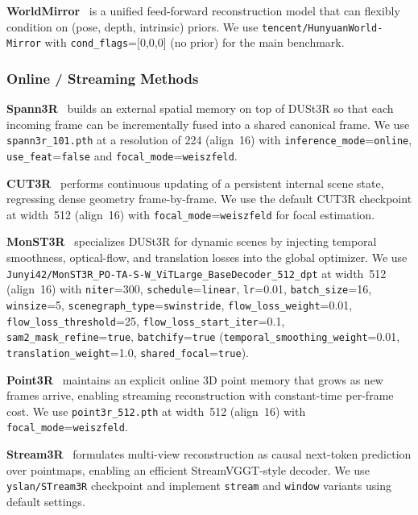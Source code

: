 \documentclass{llmxive}
\begin{document}
\textbf{WorldMirror}~\citep{liu2025worldmirror} is a unified feed-forward reconstruction model that can flexibly condition on (pose, depth, intrinsic) priors.
%
We use \texttt{tencent/HunyuanWorld-Mirror} with \texttt{cond\_flags}=[0,0,0] (no prior) for the main benchmark.

\subsubsection{Online / Streaming Methods}

\textbf{Spann3R}~\citep{wang2024spann3r} builds an external spatial memory on top of DUSt3R so that each incoming frame can be incrementally fused into a shared canonical frame.
%
We use \texttt{spann3r\_101.pth} at a resolution of 224 (align~16) with \texttt{inference\_mode}=\texttt{online}, \texttt{use\_feat}=\texttt{false} and
\texttt{focal\_mode}=\texttt{weiszfeld}.

\textbf{CUT3R}~\citep{wang2025cut3r} performs continuous updating of a persistent internal scene state, regressing dense geometry frame-by-frame. We use the default CUT3R checkpoint at width~512 (align~16) with \texttt{focal\_mode}=\texttt{weiszfeld} for focal estimation.

\textbf{MonST3R}~\citep{zhang2024monst3r} specializes DUSt3R for dynamic scenes by injecting temporal smoothness, optical-flow, and translation losses into the global optimizer.
%
We use \texttt{Junyi42/MonST3R\_PO-TA-S-W\_ViTLarge\_BaseDecoder\_512\_dpt} at width~512 (align~16) with \texttt{niter}=300, \texttt{schedule}=\texttt{linear}, \texttt{lr}=0.01, \texttt{batch\_size}=16, \texttt{winsize}=5, \texttt{scenegraph\_type}=\texttt{swinstride}, \texttt{flow\_loss\_weight}=0.01, \texttt{flow\_loss\_threshold}=25, \texttt{flow\_loss\_start\_iter}=0.1, \texttt{sam2\_mask\_refine}=\texttt{true}, \texttt{batchify}=\texttt{true} (\texttt{temporal\_smoothing\_weight}=0.01, \texttt{translation\_weight}=1.0, \texttt{shared\_focal}=\texttt{true}).


\textbf{Point3R}~\citep{point3r} maintains an explicit online 3D point memory that grows as new frames arrive, enabling streaming reconstruction with constant-time per-frame cost. We use \texttt{point3r\_512.pth} at width~512 (align~16) with \texttt{focal\_mode}=\texttt{weiszfeld}.

\textbf{Stream3R}~\citep{stream3r2025} formulates multi-view reconstruction as causal next-token prediction over pointmaps, enabling an efficient StreamVGGT-style decoder. 
%
We use \texttt{yslan/STream3R} checkpoint and implement \texttt{stream} and \texttt{window} variants using default settings.
\end{document}
